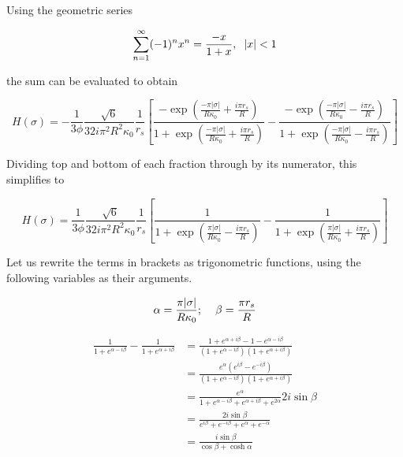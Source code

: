 \documentclass[onecolumn]{aastex63}
\begin{document}
Using the geometric series

\begin{equation}
    \sum_{n=1}^{\infty}(-1)^nx^n = \frac{-x}{1+x}, \hspace{0.2cm} |x| < 1
\end{equation}

the sum can be evaluated to obtain

\begin{equation}
    H(\sigma) = - \frac{1}{3 \phi} \frac{\sqrt{6}}{32 i \pi^2 R^2 \kappa_0} \frac{1}{r_s} \left[\frac{-\exp{\left(\frac{-\pi |\sigma|}{R\kappa_0} + \frac{i\pi r_s}{R}\right)}}{1 + \exp{\left(\frac{-\pi |\sigma|}{R\kappa_0} + \frac{i\pi r_s}{R}\right)}}-\frac{-\exp{\left(\frac{-\pi |\sigma|}{R\kappa_0} - \frac{i\pi r_s}{R}\right)}}{1 + \exp{\left(\frac{-\pi |\sigma|}{R\kappa_0} - \frac{i\pi r_s}{R}\right)}}\right]
\end{equation}

Dividing top and bottom of each fraction through by its numerator, this simplifies to

\begin{equation} \label{before_trig}
    H(\sigma) = \frac{1}{3 \phi} \frac{\sqrt{6}}{32 i \pi^2 R^2 \kappa_0} \frac{1}{r_s} \left[\frac{1}{1 + \exp{\left(\frac{\pi |\sigma|}{R\kappa_0} - \frac{i\pi r_s}{R}\right)}}-\frac{1}{1 + \exp{\left(\frac{\pi |\sigma|}{R\kappa_0} + \frac{i\pi r_s}{R}\right)}}\right]
\end{equation}

Let us rewrite the terms in brackets as trigonometric functions, using the following variables as their arguments.

\begin{equation}
    \alpha = \frac{\pi |\sigma|}{R\kappa_0}; \hspace{0.4cm} \beta = \frac{\pi r_s}{R}
\end{equation}

\begin{equation}
    \begin{split}
    \frac{1}{1+e^{\alpha - i\beta}} - \frac{1}{1+e^{\alpha + i\beta}} &= \frac{1+e^{\alpha + i\beta} - 1 - e^{\alpha - i\beta}}{\left(1+e^{\alpha - i\beta}\right)\left(1+e^{\alpha + i\beta}\right)} \\
    &= \frac{e^{\alpha}\left(e^{i\beta} - e^{- i\beta}\right)}{\left(1+e^{\alpha - i\beta}\right)\left(1+e^{\alpha + i\beta}\right)} \\
    &= \frac{e^{\alpha}}{1 + e^{\alpha - i\beta} + e^{\alpha + i\beta} + e^{2\alpha}} 2i \sin{\beta} \\
    &= \frac{2i \sin{\beta}}{e^{i\beta} + e^{- i\beta} + e^{\alpha} + e^{-\alpha}} \\
    &= \frac{i \sin{\beta}}{\cos{\beta} + \cosh{\alpha}}
    \end{split}
\end{equation}
\end{document}
